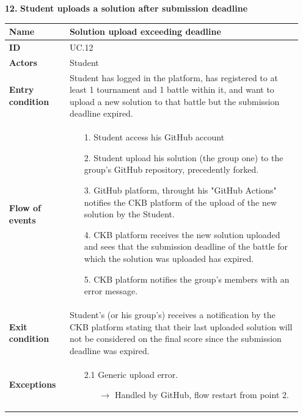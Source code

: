 \documentclass{article}
\begin{document}
{\begin{enumerate}
    \item[\textbf{12.}] \textbf{Student uploads a solution after submission deadline}
          \begin{xltabular}{\textwidth}
              {| >{\raggedright\arraybackslash}g | >{\raggedright\arraybackslash}X |}
              \hline
              \endfirsthead
              \hline
              \endhead
              \endfoot
              \hline
              \endlastfoot




              \textbf{Name} & Solution upload exceeding deadline\\
              \hline
              \textbf{ID} & UC.12\\
              \hline
              \textbf{Actors} & Student\\
              \hline
              \textbf{Entry condition} & Student has logged in the platform, has registered to at least 1 tournament
              and 1 battle within it, and want to upload a new solution to that battle but the submission deadline
              expired. \\
              \hline
              \textbf{Flow of events} &    \begin{enumerate}
                  \item[1.] Student access his GitHub account
                  \item[2.] Student upload his solution (the group one)
                        to the group's GitHub repository, precedently forked.
                  \item[3.] GitHub platform, throught his "GitHub Actions" notifies
                        the CKB platform of the upload of the new solution by the Student.
                  \item[4.] CKB platform receives the new solution uploaded and sees
                        that the submission deadline of the battle for which the solution
                        was uploaded has expired.
                  \item[5.] CKB platform notifies the group's members with an error message.
              \end{enumerate} \\
              \hline
              \textbf{Exit condition} & Student's (or his group's) receives a notification by the CKB platform
              stating that their last uploaded solution will not be considered on the final score since the
              submission deadline was expired.\\
              \hline
              \textbf{Exceptions} &    \begin{itemize}
                  \item[2.1] Generic upload error.
                        \begin{itemize}
                            \item[$\rightarrow$] Handled by GitHub, flow restart from point 2.
                        \end{itemize}
              \end{itemize}
          \end{xltabular}


\end{enumerate}}
\end{document}
